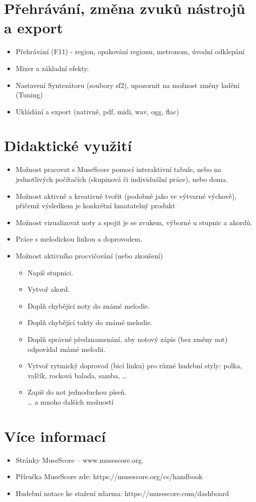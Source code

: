 \documentclass[12pt,a4paper]{article}
\begin{document}
\section{Přehrávání, změna zvuků nástrojů a export}
	
\begin{itemize}
	\item Přehrávání (F11) - region, opakování regionu, metronom, úvodní odklepání
	\item Mixer a základní efekty.
	\item Nastavení Syntezátoru (soubory sf2), upozornit na možnost změny ladění (Tuning)
	\item Ukládání a export (nativně, pdf, midi, wav, ogg, flac)
\end{itemize}	

\section{Didaktické využití}
	
\begin{itemize}
	\item Možnost pracovat s MuseScore pomocí interaktivní tabule, nebo na jednotlivých počítačích (skupinová či individuální práce), nebo doma.
	\item Možnost aktivně a kreativně tvořit (podobně jako ve výtvarné výchově), přičemž výsledkem je konkrétní hmatatelný produkt
	\item Možnost vizualizovat noty a spojit je se zvukem, výborné u stupnic a akordů.
	\item Práce s melodickou linkou a doprovodem. \enlargethispage{-60pt}
	\item Možnost aktivního procvičování (nebo zkoušení)
	\begin{itemize}
		\item Napiš stupnici.
		\item Vytvoř akord.
		\item Doplň chybějící noty do známé melodie.
		\item Doplň chybějící takty do známé melodie.
		\item Doplň správné předznamenání, aby notový zápis (bez změny not) odpovídal známé melodii.
		\item Vytvoř rytmický doprovod (bicí linku) pro různé hudební styly: polka, valčík, rocková balada, samba, \ldots{}
		\item Zapiš do not jednoduchou píseň. \\
		\ldots{} a mnoho dalších možností
	\end{itemize}

\end{itemize}	

\section{Více informací}
\begin{itemize}
	\item Stránky MuseScore -- www.musescore.org.
	\item Příručka MuseScore zde: https://musescore.org/cs/handbook
	\item Hudební notace ke stažení zdarma: https://musescore.com/dashboard
\end{itemize}
\end{document}
